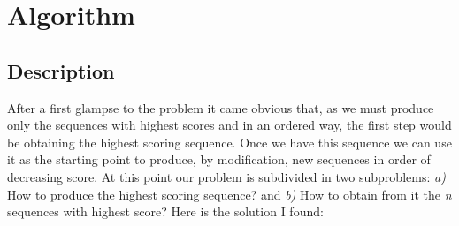 \documentclass{article}
\begin{document}
\section{Algorithm} \label{algorithm}
\subsection{Description} \label{alg:description}

After a first glampse to the problem it came obvious that, as we must produce only the sequences with highest scores and in an ordered way, the first step would be obtaining the highest scoring sequence. Once we have this sequence we can use it as the starting point to produce, by modification, new sequences in order of decreasing score. At this point our problem is subdivided in two subproblems: \emph{a) } How to produce the highest scoring sequence? and \emph{b) } How to obtain from it the \emph{n} sequences with highest score? Here is the solution I found:\\
\end{document}
